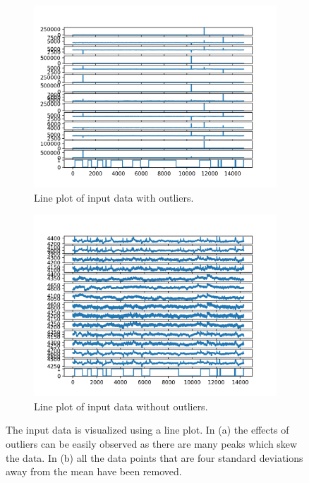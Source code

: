 \documentclass[10pt,twocolumn,letterpaper]{article}
\begin{document}
\begin{figure}
  \centering
  \begin{subfigure}{0.47\linewidth}
    \includegraphics[width=\textwidth]{img1.png}
    \caption{Line plot of input data with outliers.}
    \label{fig:short-a}
  \end{subfigure}
  \hfill
  \begin{subfigure}{0.47\linewidth}
    \includegraphics[width=\textwidth]{img2.png}
    \caption{Line plot of input data without outliers.}
    \label{fig:short-b}
  \end{subfigure}
  \caption{The input data is visualized using a line plot. In (a) the effects of outliers can be easily observed as there are many peaks which skew the data. In (b) all the data points that are four standard deviations away from the mean have been removed.}
  \label{fig:short}
\end{figure}
\end{document}
